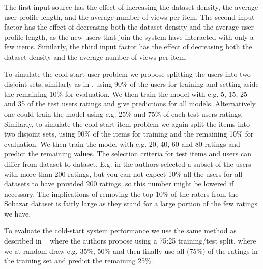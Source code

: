 The first input source has the effect of increasing the dataset density, the
average user profile length, and the average number of views per item. The
second input factor has the effect of decreasing both the dataset density and
the average user profile length, as the new users that join the system have
interacted with only a few items. Similarly, the third input factor has the
effect of decreasing both the dataset density and the average number of views
per item.

To simulate the cold-start user problem we propose splitting the users into two
disjoint sets, similarly as in \cite{Stern2009, Lam2008}, using 90\% of the
users for training and setting aside the remaining 10\% for evaluation. We then
train the model with e.g. 5, 15, 25 and 35 of the test users ratings and give
predictions for all models. Alternatively one could train the model using e.g.
25\% and 75\% of each test users ratings. Similarly, to simulate the cold-start
item problem we again split the items into two disjoint sets, using 90\% of the
items for training and the remaining 10\% for evaluation.  We then train the
model with e.g. 20, 40, 60 and 80 ratings and predict the remaining values. The
selection criteria for test items and users can differ from dataset to dataset.
E.g. in \cite{Rashid2002, Rashid2008} the authors selected a subset of the
users with more than 200 ratings, but you can not expect 10\% all the users for
all datasets to have provided 200 ratings, so this number might be lowered if
necessary. The implications of removing the top 10\% of the raters from the
Sobazar dataset is fairly large as they stand for a large portion of the few
ratings we have.

To evaluate the cold-start system performance we use the same method as
described in ~\cite{Agarwal2009} where the authors propose using a 75:25
training/test split, where we at random draw e.g. 35\%, 50\% and then finally
use all (75\%) of the ratings in the training set and predict the remaining
25\%.


